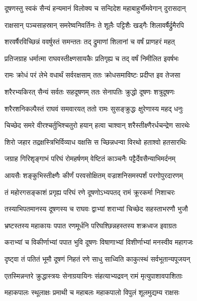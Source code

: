 
\twolineshloka
{दूषणस्तु स्वकं सैन्यं हन्यमानं विलोक्य च}
{सन्दिदेश महाबाहुर्भीमवेगान् दुरासदान्} %

\twolineshloka
{राक्षसान् पञ्चसाहस्रान् समरेष्वनिवर्तिनः}
{ते शूलैः पट्टिशैः खड्गैः शिलावर्षैर्द्रुमैरपि} %

\twolineshloka
{शरवर्षैरविच्छिन्नं ववर्षुस्तं समन्ततः}
{तद् द्रुमाणां शिलानां च वर्षं प्राणहरं महत्} %

\twolineshloka
{प्रतिजग्राह धर्मात्मा राघवस्तीक्ष्णसायकैः}
{प्रतिगृह्य च तद् वर्षं निमीलित इवर्षभः} %

\twolineshloka
{रामः क्रोधं परं लेभे वधार्थं सर्वरक्षसाम्}
{ततः क्रोधसमाविष्टः प्रदीप्त इव तेजसा} %

\twolineshloka
{शरैरभ्यकिरत् सैन्यं सर्वतः सहदूषणम्}
{ततः सेनापतिः क्रुद्धो दूषणः शत्रुदूषणः} %

\twolineshloka
{शरैरशनिकल्पैस्तं राघवं समवारयत्}
{ततो रामः सुसङ्क्रुद्धः क्षुरेणास्य महद् धनुः} %

\twolineshloka
{चिच्छेद समरे वीरश्चर्तुभिश्चतुरो हयान्}
{हत्वा चाश्वान् शरैस्तीक्ष्णैरर्धचन्द्रेण सारथेः} %

\twolineshloka
{शिरो जहार तद्रक्षस्त्रिभिर्विव्याध वक्षसि}
{स च्छिन्नधन्वा विरथो हताश्वो हतसारथिः} %

\twolineshloka
{जग्राह गिरिशृङ्गाभं परिघं रोमहर्षणम्}
{वेष्टितं काञ्चनैः पट्टैर्देवसैन्याभिमर्दनम्} %

\twolineshloka
{आयसैः शङ्कुभिस्तीक्ष्णैः कीर्णं परवसोक्षितम्}
{वज्राशनिसमस्पर्शं परगोपुरदारणम्} %

\twolineshloka
{तं महोरगसङ्काशं प्रगृह्य परिघं रणे}
{दूषणोऽभ्यपतद् रामं क्रूरकर्मा निशाचरः} %

\twolineshloka
{तस्याभिपतमानस्य दूषणस्य च राघवः}
{द्वाभ्यां शराभ्यां चिच्छेद सहस्ताभरणौ भुजौ} %

\twolineshloka
{भ्रष्टस्तस्य महाकायः पपात रणमूर्धनि}
{परिघश्छिन्नहस्तस्य शक्रध्वज इवाग्रतः} %

\twolineshloka
{कराभ्यां च विकीर्णाभ्यां पपात भुवि दूषणः}
{विषाणाभ्यां विशीर्णाभ्यां मनस्वीव महागजः} %

\twolineshloka
{दृष्ट्वा तं पतितं भूमौ दूषणं निहतं रणे}
{साधु साध्विति काकुत्स्थं सर्वभूतान्यपूजयन्} %

\twolineshloka
{एतस्मिन्नन्तरे क्रुद्धास्त्रयः सेनाग्रयायिनः}
{संहत्याभ्यद्रवन् रामं मृत्युपाशावपाशिताः} %

\twolineshloka
{महाकपालः स्थूलाक्षः प्रमाथी च महाबलः}
{महाकपालो विपुलं शूलमुद्यम्य राक्षसः} %

